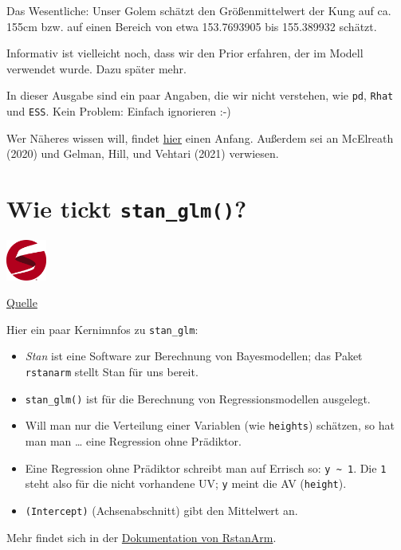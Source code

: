 \documentclass[
  a4paper,
  DIV=11]{scrreprt}
\providecommand{\tightlist}{%
  \setlength{\itemsep}{0pt}\setlength{\parskip}{0pt}}\usepackage{longtable,booktabs,array}
\theoremstyle{definition}
\theoremstyle{remark}
\begin{document}
Das Wesentliche: Unser Golem schätzt den Größenmittelwert der Kung auf
ca. 155cm bzw. auf einen Bereich von etwa 153.7693905 bis 155.389932
schätzt.

Informativ ist vielleicht noch, dass wir den Prior erfahren, der im
Modell verwendet wurde. Dazu später mehr.

In dieser Ausgabe sind ein paar Angaben, die wir nicht verstehen, wie
\texttt{pd}, \texttt{Rhat} und \texttt{ESS}. Kein Problem: Einfach
ignorieren :-)

Wer Näheres wissen will, findet \href{}{hier} einen Anfang. Außerdem sei
an McElreath (2020) und Gelman, Hill, und Vehtari (2021) verwiesen.

\hypertarget{wie-tickt-stan_glm}{%
\section{\texorpdfstring{Wie tickt
\texttt{stan\_glm()}?}{Wie tickt stan\_glm()?}}\label{wie-tickt-stan_glm}}

\includegraphics[width=0.1\textwidth,height=\textheight]{./img/stanlogo.png}

\href{https://mc-stan.org/}{Quelle}

Hier ein paar Kernimnfos zu \texttt{stan\_glm}:

\begin{itemize}
\tightlist
\item
  \emph{Stan} ist eine Software zur Berechnung von Bayesmodellen; das
  Paket \texttt{rstanarm} stellt Stan für uns bereit.
\item
  \texttt{stan\_glm()} ist für die Berechnung von Regressionsmodellen
  ausgelegt.
\item
  Will man nur die Verteilung einer Variablen (wie \texttt{heights})
  schätzen, so hat man man \ldots{} eine Regression ohne Prädiktor.
\item
  Eine Regression ohne Prädiktor schreibt man auf Errisch so:
  \texttt{y\ \textasciitilde{}\ 1}. Die \texttt{1} steht also für die
  nicht vorhandene UV; \texttt{y} meint die AV (\texttt{height}).
\item
  \texttt{(Intercept)} (Achsenabschnitt) gibt den Mittelwert an.
\end{itemize}

Mehr findet sich in der
\href{https://mc-stan.org/rstanarm/}{Dokumentation von RstanArm}.
\end{document}
